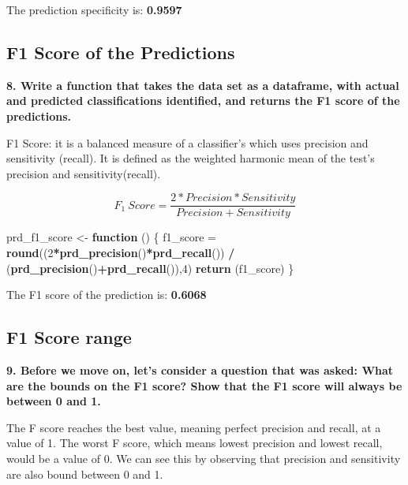 \documentclass[]{article}
\newenvironment{Shaded}{\begin{snugshade}}{\end{snugshade}}
\newcommand{\ControlFlowTok}[1]{\textcolor[rgb]{0.13,0.29,0.53}{\textbf{#1}}}
\newcommand{\DecValTok}[1]{\textcolor[rgb]{0.00,0.00,0.81}{#1}}
\newcommand{\KeywordTok}[1]{\textcolor[rgb]{0.13,0.29,0.53}{\textbf{#1}}}
\newcommand{\NormalTok}[1]{#1}
\newcommand{\OperatorTok}[1]{\textcolor[rgb]{0.81,0.36,0.00}{\textbf{#1}}}
\newcommand{\StringTok}[1]{\textcolor[rgb]{0.31,0.60,0.02}{#1}}
\begin{document}
The prediction specificity is: \textbf{0.9597}

\hypertarget{f1-score-of-the-predictions}{%
\subsection{F1 Score of the
Predictions}\label{f1-score-of-the-predictions}}

\textbf{8. Write a function that takes the data set as a dataframe, with
actual and predicted classifications identified, and returns the F1
score of the predictions.}

F1 Score: it is a balanced measure of a classifier's which uses
precision and sensitivity (recall). It is defined as the weighted
harmonic mean of the test's precision and sensitivity(recall).

\[F_1\:Score = \frac {2 * Precision * Sensitivity}{Precision + Sensitivity} \]

\begin{Shaded}
\begin{Highlighting}[]
\NormalTok{prd_f1_score <-}\StringTok{ }\ControlFlowTok{function}\NormalTok{ () \{}
\NormalTok{    f1_score =}\StringTok{ }\KeywordTok{round}\NormalTok{((}\DecValTok{2}\OperatorTok{*}\KeywordTok{prd_precision}\NormalTok{()}\OperatorTok{*}\KeywordTok{prd_recall}\NormalTok{()) }\OperatorTok{/}\StringTok{ }\NormalTok{(}\KeywordTok{prd_precision}\NormalTok{()}\OperatorTok{+}\KeywordTok{prd_recall}\NormalTok{()),}\DecValTok{4}\NormalTok{)}
    \KeywordTok{return}\NormalTok{ (f1_score)}
\NormalTok{\}}
\end{Highlighting}
\end{Shaded}

The F1 score of the prediction is: \textbf{0.6068 }

\hypertarget{f1-score-range}{%
\subsection{F1 Score range}\label{f1-score-range}}

\textbf{9. Before we move on, let's consider a question that was asked:
What are the bounds on the F1 score? Show that the F1 score will always
be between 0 and 1. }

The F score reaches the best value, meaning perfect precision and
recall, at a value of 1. The worst F score, which means lowest precision
and lowest recall, would be a value of 0. We can see this by observing
that precision and sensitivity are also bound between 0 and 1.
\end{document}

